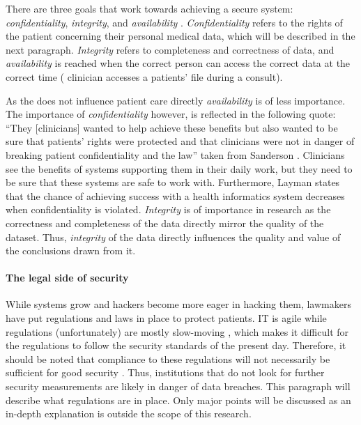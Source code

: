 There are three goals that work towards achieving a secure system: \emph{confidentiality}, \emph{integrity}, and \emph{availability} \cite{s8FernandezAleman2013}.
\emph{Confidentiality} refers to the rights of the patient concerning their personal medical data, which will be described in the next paragraph.
\emph{Integrity} refers to completeness and correctness of data, and \emph{availability} is reached when the correct person can access the correct data at the correct time (\eg{} clinician accesses a patients' file during a consult).

As the \ivfsystem{} does not influence patient care directly \emph{availability} is of less importance.
The importance of \emph{confidentiality} however, is reflected in the following quote: ``They [clinicians] wanted to help achieve these benefits but also wanted to be sure that patients' rights were protected and that clinicians were not in danger of breaking patient confidentiality and the law'' taken from Sanderson \cite{s5Sanderson2004}.
Clinicians see the benefits of systems supporting them in their daily work, but they need to be sure that these systems are safe to work with.
Furthermore, Layman \cite{s4Layman2008} states that the chance of achieving success with a health informatics system decreases when confidentiality is violated.
\emph{Integrity} is of importance in research as the correctness and completeness of the data directly mirror the quality of the dataset.
Thus, \emph{integrity} of the data directly influences the quality and value of the conclusions drawn from it.

\paragraph{The legal side of security}
\label{security-legal}

While systems grow and hackers become more eager in hacking them, lawmakers have put regulations and laws in place to protect patients.
IT is agile while regulations (unfortunately) are mostly slow-moving \cite{s20Groves2013}, which makes it difficult for the regulations to follow the security standards of the present day.
Therefore, it should be noted that compliance to these regulations will not necessarily be sufficient for good security \cite{s20Groves2013}.
Thus, institutions that do not look for further security measurements are likely in danger of data breaches.
This paragraph will describe what regulations are in place. 
Only major points will be discussed as an in-depth explanation is outside the scope of this research.

